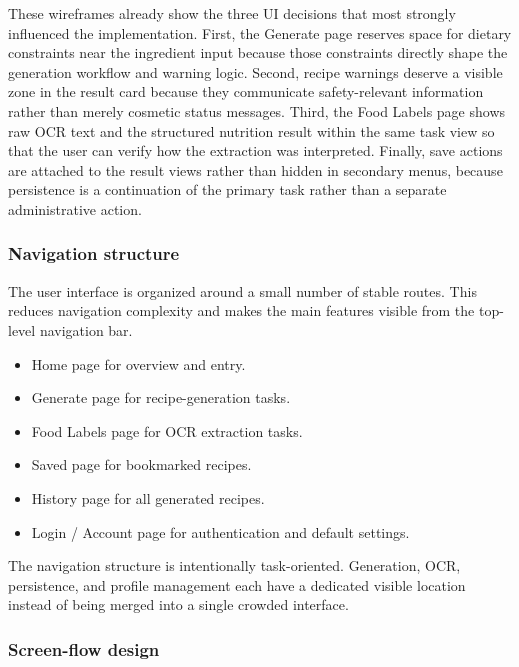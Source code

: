 These wireframes already show the three UI decisions that most strongly
influenced the implementation. First, the Generate page reserves space
for dietary constraints near the ingredient input because those
constraints directly shape the generation workflow and warning logic.
Second, recipe warnings deserve a visible zone in the result card
because they communicate safety-relevant information rather than merely
cosmetic status messages. Third, the Food Labels page shows raw OCR text
and the structured nutrition result within the same task view so that
the user can verify how the extraction was interpreted. Finally, save
actions are attached to the result views rather than hidden in secondary
menus, because persistence is a continuation of the primary task rather
than a separate administrative action.

\subsubsection{Navigation structure}

The user interface is organized around a small number of stable routes.
This reduces navigation complexity and makes the main features visible
from the top-level navigation bar.

\begin{itemize}
	\item Home page for overview and entry.
	\item Generate page for recipe-generation tasks.
	\item Food Labels page for OCR extraction tasks.
	\item Saved page for bookmarked recipes.
	\item History page for all generated recipes.
	\item Login / Account page for authentication and default settings.
\end{itemize}

The navigation structure is intentionally task-oriented. Generation,
OCR, persistence, and profile management each have a dedicated visible
location instead of being merged into a single crowded interface.

\subsubsection{Screen-flow design}

